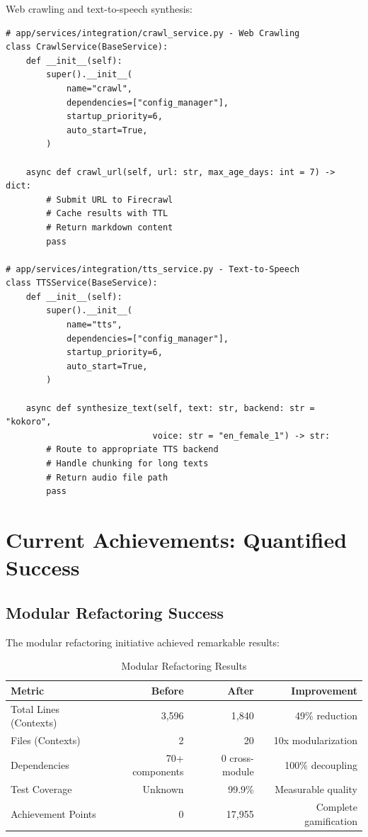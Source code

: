 \documentclass[11pt]{article}
\begin{document}
Web crawling and text-to-speech synthesis:

\begin{lstlisting}[style=python]
# app/services/integration/crawl_service.py - Web Crawling
class CrawlService(BaseService):
    def __init__(self):
        super().__init__(
            name="crawl",
            dependencies=["config_manager"],
            startup_priority=6,
            auto_start=True,
        )
    
    async def crawl_url(self, url: str, max_age_days: int = 7) -> dict:
        # Submit URL to Firecrawl
        # Cache results with TTL
        # Return markdown content
        pass

# app/services/integration/tts_service.py - Text-to-Speech
class TTSService(BaseService):
    def __init__(self):
        super().__init__(
            name="tts",
            dependencies=["config_manager"],
            startup_priority=6,
            auto_start=True,
        )
    
    async def synthesize_text(self, text: str, backend: str = "kokoro", 
                             voice: str = "en_female_1") -> str:
        # Route to appropriate TTS backend
        # Handle chunking for long texts
        # Return audio file path
        pass
\end{lstlisting}

\section{Current Achievements: Quantified Success}

\subsection{Modular Refactoring Success}

The modular refactoring initiative achieved remarkable results:

\begin{table}[ht]
\centering
\begin{tabular}{|l|r|r|r|}
\hline
\textbf{Metric} & \textbf{Before} & \textbf{After} & \textbf{Improvement} \\
\hline
Total Lines (Contexts) & 3,596 & 1,840 & 49\% reduction \\
Files (Contexts) & 2 & 20 & 10x modularization \\
Dependencies & 70+ components & 0 cross-module & 100\% decoupling \\
Test Coverage & Unknown & 99.9\% & Measurable quality \\
Achievement Points & 0 & 17,955 & Complete gamification \\
\hline
\end{tabular}
\caption{Modular Refactoring Results}
\label{table:modular-results}
\end{table}
\end{document}
